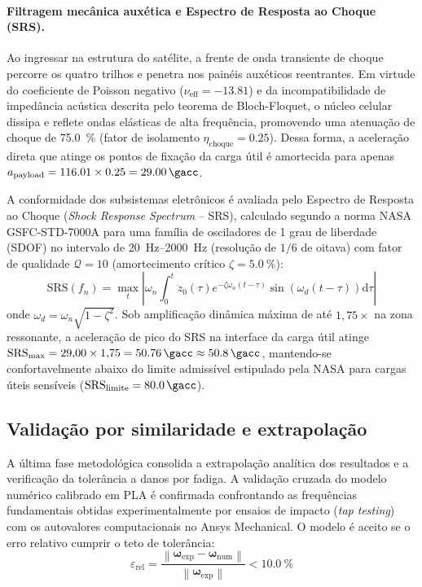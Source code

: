 \paragraph{Filtragem mecânica auxética e Espectro de Resposta ao Choque (SRS).}
Ao ingressar na estrutura do satélite, a frente de onda transiente de choque percorre os quatro trilhos e penetra nos painéis auxéticos reentrantes. Em virtude do coeficiente de Poisson negativo ($\nu_{\text{eff}} = \num{-13.81}$) e da incompatibilidade de impedância acústica descrita pelo teorema de Bloch-Floquet, o núcleo celular dissipa e reflete ondas elásticas de alta frequência, promovendo uma atenuação de choque de \SI{75.0}{\percent} (fator de isolamento $\eta_{\text{choque}} = \num{0.25}$). Dessa forma, a aceleração direta que atinge os pontos de fixação da carga útil é amortecida para apenas $a_{\text{payload}} = \num{116.01} \times \num{0.25} = \SI{29.00}{\gacc}$.

A conformidade dos subsistemas eletrônicos é avaliada pelo Espectro de Resposta ao Choque (\textit{Shock Response Spectrum} -- SRS), calculado segundo a norma NASA GSFC-STD-7000A para uma família de osciladores de 1 grau de liberdade (SDOF) no intervalo de \SIrange{20}{2000}{\hertz} (resolução de $1/6$ de oitava) com fator de qualidade $\mathcal{Q} = 10$ (amortecimento crítico $\zeta = \SI{5.0}{\percent}$):
\begin{equation}
  \text{SRS}(f_n) = \max_{t} \left| \omega_n \int_{0}^{t} \ddot{z}_0(\tau) e^{-\zeta \omega_n (t-\tau)} \sin\!\left(\omega_d (t-\tau)\right) \mathrm{d}\tau \right|
  \label{eq:srs-calculo}
\end{equation}
onde $\omega_d = \omega_n \sqrt{1 - \zeta^2}$. Sob amplificação dinâmica máxima de até $1{,}75\times$ na zona ressonante, a aceleração de pico do SRS na interface da carga útil atinge $\text{SRS}_{\max} = 29{,}00 \times 1{,}75 = \SI{50.76}{\gacc} \approx \SI{50.8}{\gacc}$, mantendo-se confortavelmente abaixo do limite admissível estipulado pela NASA para cargas úteis sensíveis ($\text{SRS}_{\text{limite}} = \SI{80.0}{\gacc}$).

\subsection{Validação por similaridade e extrapolação}
\label{subsec:validacao}

A última fase metodológica consolida a extrapolação analítica dos resultados e a verificação da tolerância a danos por fadiga. A validação cruzada do modelo numérico calibrado em PLA é confirmada confrontando as frequências fundamentais obtidas experimentalmente por ensaios de impacto (\textit{tap testing}) com os autovalores computacionais no Ansys Mechanical. O modelo é aceito se o erro relativo cumprir o teto de tolerância:
\begin{equation}
  \varepsilon_{\text{rel}} = \frac{\left\| \boldsymbol{\omega}_{\text{exp}} - \boldsymbol{\omega}_{\text{num}} \right\|}{\left\| \boldsymbol{\omega}_{\text{exp}} \right\|} < \SI{10.0}{\percent}
  \label{eq:verr}
\end{equation}

